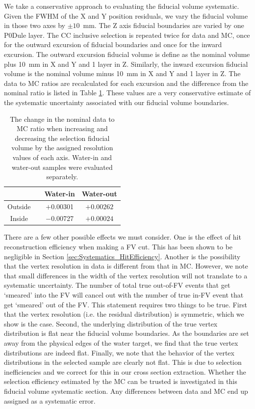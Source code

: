 We take a conservative approach to evaluating the fiducial volume systematic. Given the FWHM of the X and Y position residuals, we vary the fiducial volume in those two axes by $\pm10$~mm. The Z axis fiducial boundaries are varied by one P0Dule layer. The CC inclusive selection is repeated twice for data and MC, once for the outward excursion of fiducial boundaries and once for the inward excursion. The outward excursion fiducial volume is define as the nominal volume plus 10~mm in X and Y and 1 layer in Z. Similarly, the inward excursion fiducial volume is the nominal volume minus 10~mm in X and Y and 1 layer in Z. The data to MC ratios are recalculated for each excursion and the difference from the nominal ratio is listed in Table \ref{tab:FVSystematic}. These values are a very conservative estimate of the systematic uncertainty associated with our fiducial volume boundaries.

\begin{table}[h]
\caption{The change in the nominal data to MC ratio when increasing and decreasing the selection fiducial volume by the assigned resolution values of each axis. Water-in and water-out samples were evaluated separately.}
\centering
\begin{tabular}{cccc}\toprule
 & & Water-in & Water-out \\ \midrule
Outside & & $+$0.00301 & $+0.00262$\\
Inside & & $-$0.00727 & $+0.00024$\\
\bottomrule
\end{tabular} 

\label{tab:FVSystematic}
\end{table}

There are a few other possible effects we must consider. One is the effect of hit reconstruction efficiency when making a FV cut. This has been shown to be negligible in Section \ref{sec:Systematics_HitEfficiency}. Another is the possibility that the vertex resolution in data is different from that in MC. However, we note that small differences in the width of the vertex resolution will not translate to a systematic uncertainty. The number of total true out-of-FV events that get `smeared' into the FV will cancel out with the number of true in-FV event that get `smeared' out of the FV. This statement requires two things to be true. First that the vertex resolution (i.e. the residual distribution) is symmetric, which we show is the case. Second, the underlying distribution of the true vertex distribution is flat near the fiducial volume boundaries. As the boundaries are set away from the physical edges of the water target, we find that the true vertex distributions are indeed flat. Finally, we note that the behavior of the vertex distributions in the selected sample are clearly not flat. This is due to selection inefficiencies and we correct for this in our cross section extraction. Whether the selection efficiency estimated by the MC can be trusted is investigated in this fiducial volume systematic section. Any differences between data and MC end up assigned as a systematic error.

